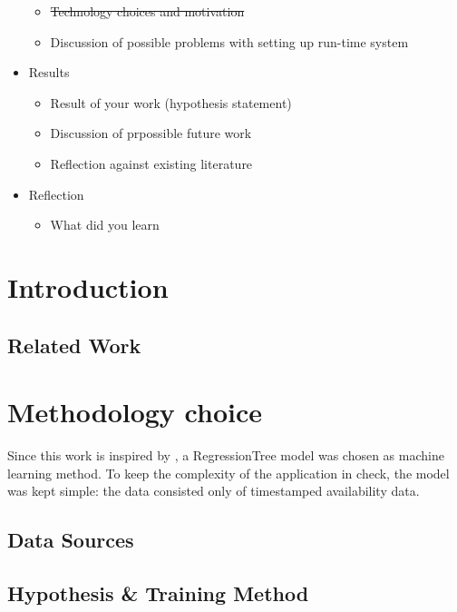 \documentclass[journal,10pt]{IEEEtran}
\begin{document}
\begin{itemize}
\begin{itemize}
    \item \st{Technology choices and motivation}
    \item Discussion of possible problems with setting up run-time system
  \end{itemize}
  \item Results
  \begin{itemize}
    \item Result of your work (hypothesis statement)
    \item Discussion of prpossible future work
    \item Reflection against existing literature
  \end{itemize}
  \item Reflection
  \begin{itemize}
    \item What did you learn
  \end{itemize}
\end{itemize}






\section{Introduction}



\subsection{Related Work}



\section{Methodology choice}

Since this work is inspired by \cite{parkendd}, a RegressionTree model was chosen as machine learning method. To keep the complexity of the application in check, the model was kept simple: the data consisted only of timestamped availability data.

\subsection{Data Sources}\label{data sources}


\subsection{Hypothesis \& Training Method}\label{sec:training_model}

\end{document}
